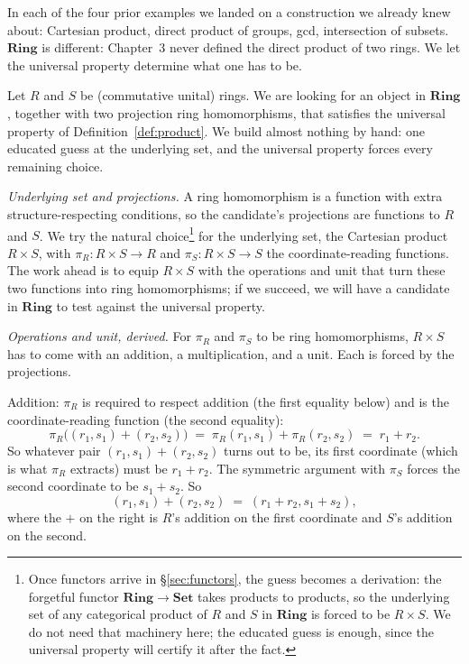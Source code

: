 \noindent In each of the four prior examples we landed on a
construction we already knew about: Cartesian product, direct
product of groups, gcd, intersection of subsets. $\mathbf{Ring}$
is different: Chapter~3 never defined the direct product of two
rings. We let the universal property determine what one has to be.

\begin{example}\label{ex:ring-product}
Let $R$ and $S$ be (commutative unital) rings. We are looking for an
object in $\mathbf{Ring}$, together with two projection ring
homomorphisms, that satisfies the universal property of
Definition~\ref{def:product}. We build almost nothing by hand: one
educated guess at the underlying set, and the universal property
forces every remaining choice.

\textit{Underlying set and projections.} A ring homomorphism is a
function with extra structure-respecting conditions, so the
candidate's projections are functions to $R$ and $S$. We try the
natural choice\footnote{Once functors arrive in
\S\ref{sec:functors}, the guess becomes a derivation: the forgetful
functor $\mathbf{Ring} \to \mathbf{Set}$ takes products to products,
so the underlying set of any categorical product of $R$ and $S$ in
$\mathbf{Ring}$ is forced to be $R \times S$. We do not need that
machinery here; the educated guess is enough, since the universal
property will certify it after the fact.} for the underlying set,
the Cartesian product $R \times S$, with $\pi_R : R \times S \to R$
and $\pi_S : R \times S \to S$ the coordinate-reading functions. The
work ahead is to equip $R \times S$ with the operations and unit
that turn these two functions into ring homomorphisms; if we
succeed, we will have a candidate in $\mathbf{Ring}$ to test against
the universal property.

\textit{Operations and unit, derived.} For $\pi_R$ and $\pi_S$ to be
ring homomorphisms, $R \times S$ has to come with an addition, a
multiplication, and a unit. Each is forced by the projections.

Addition: $\pi_R$ is required to respect addition (the first equality
below) and is the coordinate-reading function (the second equality):
\[ \pi_R\bigl((r_1, s_1) + (r_2, s_2)\bigr) \; = \; \pi_R(r_1, s_1) +
   \pi_R(r_2, s_2) \; = \; r_1 + r_2. \]
So whatever pair $(r_1, s_1) + (r_2, s_2)$ turns out to be, its first
coordinate (which is what $\pi_R$ extracts) must be $r_1 + r_2$. The
symmetric argument with $\pi_S$ forces the second coordinate to be
$s_1 + s_2$. So
\[ (r_1, s_1) + (r_2, s_2) \; = \; (r_1 + r_2, s_1 + s_2), \]
where the $+$ on the right is $R$'s addition on the first coordinate
and $S$'s addition on the second.


\end{example}
